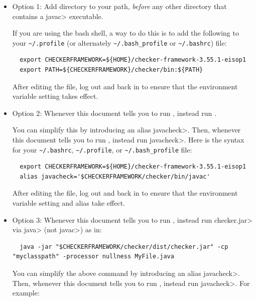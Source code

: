 \begin{itemize}
  \item
    Option 1:
    Add directory
     to your path, \emph{before} any other
    directory that contains a \<javac> executable.

    If you are
    using the bash shell, a way to do this is to add the following to your
    \verb|~/.profile| (or alternately \verb|~/.bash_profile| or \verb|~/.bashrc|) file:
\begin{Verbatim}
  export CHECKERFRAMEWORK=${HOME}/checker-framework-3.55.1-eisop1
  export PATH=${CHECKERFRAMEWORK}/checker/bin:${PATH}
\end{Verbatim}

   After editing the file, log out and back in to ensure that the environment variable
   setting takes effect.

  \item
    \begin{sloppypar}
    Option 2:
    Whenever this document tells you to run ,
    instead run .
    \end{sloppypar}

    You can simplify this by introducing an alias \<javacheck>.  Then,
    whenever this document tells you to run , instead run
    \<javacheck>.  Here is the syntax for your
    \verb|~/.bashrc|, \verb|~/.profile|, or \verb|~/.bash_profile|
    file:
\begin{Verbatim}
  export CHECKERFRAMEWORK=${HOME}/checker-framework-3.55.1-eisop1
  alias javacheck='$CHECKERFRAMEWORK/checker/bin/javac'
\end{Verbatim}

   After editing the file, log out and back in to ensure that the environment variable
   setting and alias take effect.

   \item
   Option 3:
   Whenever this document tells you to run , instead
   run \<checker.jar> via \<java> (not \<javac>) as in:

\begin{Verbatim}
  java -jar "$CHECKERFRAMEWORK/checker/dist/checker.jar" -cp "myclasspath" -processor nullness MyFile.java
\end{Verbatim}

    You can simplify the above command by introducing an alias
    \<javacheck>.  Then, whenever this document tells you to run
    , instead run \<javacheck>.  For example:


\end{itemize}
